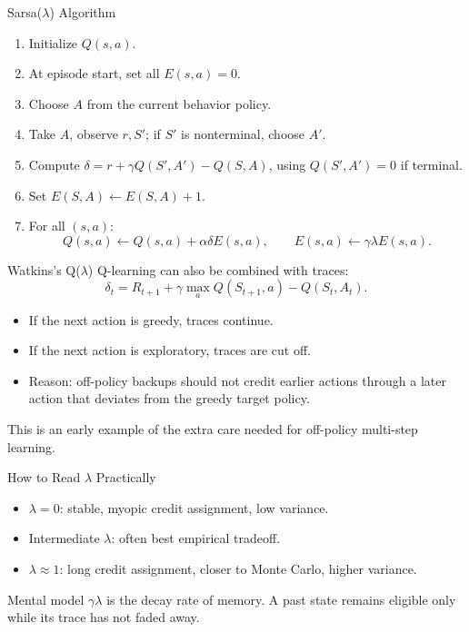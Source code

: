 \documentclass[aspectratio=169]{beamer}
\begin{document}
\begin{frame}{Sarsa($\lambda$) Algorithm}
\small
\begin{enumerate}
    \item Initialize $Q(s,a)$.
    \item At episode start, set all $E(s,a)=0$.
    \item Choose $A$ from the current behavior policy.
    \item Take $A$, observe $r,S'$; if $S'$ is nonterminal, choose $A'$.
    \item Compute $\delta=r+\gamma Q(S',A')-Q(S,A)$, using $Q(S',A')=0$ if terminal.
    \item Set $E(S,A)\leftarrow E(S,A)+1$.
    \item For all $(s,a)$:
    \[
    Q(s,a)\leftarrow Q(s,a)+\alpha\delta E(s,a),
    \qquad
    E(s,a)\leftarrow\gamma\lambda E(s,a).
    \]
\end{enumerate}
\end{frame}

\begin{frame}{Watkins's Q($\lambda$)}
\small
Q-learning can also be combined with traces:
\[
\delta_t=R_{t+1}+\gamma\max_a Q(S_{t+1},a)-Q(S_t,A_t).
\]

\vspace{0.6em}
\begin{itemize}
    \item If the next action is greedy, traces continue.
    \item If the next action is exploratory, traces are cut off.
    \item Reason: off-policy backups should not credit earlier actions through a later action that deviates from the greedy target policy.
\end{itemize}

\vspace{0.5em}
This is an early example of the extra care needed for off-policy multi-step learning.
\end{frame}

\begin{frame}{How to Read $\lambda$ Practically}
\small
\begin{itemize}
    \item $\lambda=0$: stable, myopic credit assignment, low variance.
    \item Intermediate $\lambda$: often best empirical tradeoff.
    \item $\lambda\approx 1$: long credit assignment, closer to Monte Carlo, higher variance.
\end{itemize}

\vspace{0.8em}
\begin{block}{Mental model}
$\gamma\lambda$ is the decay rate of memory. A past state remains eligible only while its trace has not faded away.
\end{block}
\end{frame}
\end{document}
